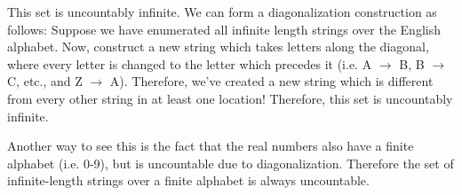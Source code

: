 \documentclass[11pt]{article}
\begin{document}
\begin{Parts}
\begin{solution}
  This set is uncountably infinite. We can form a diagonalization construction as follows: Suppose we have enumerated all infinite length strings over the English alphabet. Now, construct a new string which takes letters along the diagonal, where every letter is changed to the letter which precedes it (i.e. A $\to$ B, B $\to$ C, etc., and Z $\to$ A). Therefore, we've created a new string which is different from every other string in at least one location! Therefore, this set is uncountably infinite. 

  Another way to see this is the fact that the real numbers also have a finite alphabet (i.e. 0-9), but is uncountable due to diagonalization. Therefore the set of infinite-length strings over a finite alphabet is always uncountable. 
\end{solution}

\end{Parts}

\pagebreak
{}
\end{document}
